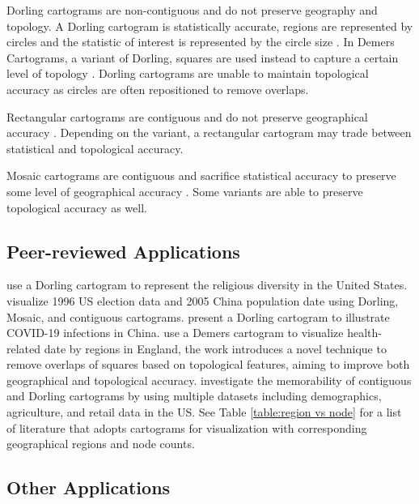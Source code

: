 Dorling cartograms are non-contiguous and do not preserve geography and topology. A Dorling cartogram is statistically accurate, regions are represented by circles and the statistic of interest is represented by the circle size \cite{dorling2011Area}.
In Demers Cartograms, a variant of Dorling, squares are used instead to capture a certain level of topology \cite{cano2015Mosaic}. Dorling cartograms are unable to maintain topological accuracy as circles are often repositioned to remove overlaps.

Rectangular cartograms are contiguous and do not preserve geographical accuracy \cite{raisz1934Rectangular}. Depending on the variant, a rectangular cartogram may trade between statistical and topological accuracy.

Mosaic cartograms are contiguous and sacrifice statistical accuracy to preserve some level of geographical accuracy \cite{cano2015Mosaic}. Some variants are able to preserve topological accuracy as well.

\subsection{Peer-reviewed Applications}

 use a Dorling cartogram to represent the religious diversity in the United States.  visualize 1996 US election data and 2005 China population date using Dorling, Mosaic, and contiguous cartograms.  present a Dorling cartogram to illustrate COVID-19 infections in China.  use a Demers cartogram to visualize health-related date by regions in England, the work introduces a novel technique to remove overlaps of squares based on topological features, aiming to improve both geographical and topological accuracy.  investigate the memorability of contiguous and Dorling cartograms by using multiple datasets including demographics, agriculture, and retail data in the US. See Table \ref{table:region vs node} for a list of literature that adopts cartograms for visualization with corresponding geographical regions and node counts.


\subsection{Other Applications}

